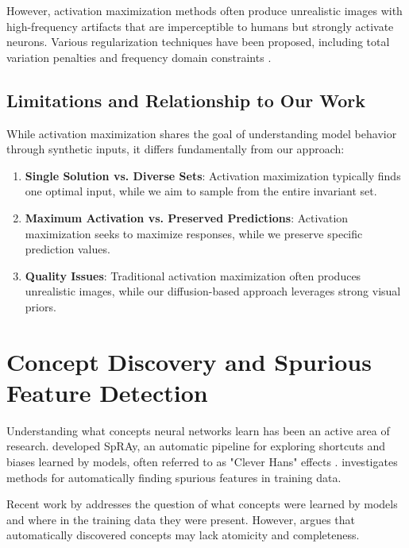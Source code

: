 \documentclass[licencjacka,en]{pracamgr}
\begin{document}
However, activation maximization methods often produce unrealistic images with high-frequency artifacts that are imperceptible to humans but strongly activate neurons. Various regularization techniques have been proposed, including total variation penalties \cite{mahendran2014understandingdeepimagerepresentations} and frequency domain constraints \cite{olah2017feature}.

\subsection{Limitations and Relationship to Our Work}

While activation maximization shares the goal of understanding model behavior through synthetic inputs, it differs fundamentally from our approach:

\begin{enumerate}
\item \textbf{Single Solution vs. Diverse Sets}: Activation maximization typically finds one optimal input, while we aim to sample from the entire invariant set.

\item \textbf{Maximum Activation vs. Preserved Predictions}: Activation maximization seeks to maximize responses, while we preserve specific prediction values.

\item \textbf{Quality Issues}: Traditional activation maximization often produces unrealistic images, while our diffusion-based approach leverages strong visual priors.
\end{enumerate}

\section{Concept Discovery and Spurious Feature Detection}

Understanding what concepts neural networks learn has been an active area of research. \cite{Lapuschkin_2019} developed SpRAy, an automatic pipeline for exploring shortcuts and biases learned by models, often referred to as "Clever Hans" effects \cite{pfungst1911cleverHans}. \cite{neuhaus2023spuriousfeatureslargescale} investigates methods for automatically finding spurious features in training data.

Recent work by \cite{dreyer2025mechanisticunderstandingvalidationlarge} addresses the question of what concepts were learned by models and where in the training data they were present. However, \cite{leask2025sparse} argues that automatically discovered concepts may lack atomicity and completeness.
\end{document}
